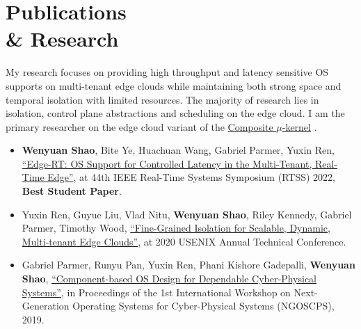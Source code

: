 \section{Publications\\ \& Research}
{\hspace*{1.7em} My research focuses on providing high throughput and latency sensitive OS supports on multi-tenant edge clouds while maintaining both strong space and temporal isolation with limited resources.
The majority of research lies in isolation, control plane abstractions and scheduling on the edge cloud.
I am the primary researcher on the edge cloud variant of the \href{https://composite.seas.gwu.edu/}{Composite $\mu$-kernel} .}

\vspace{0.2em}
\begin{itemize}[leftmargin=*]
  \setlength\itemsep{-0.0em}
  \item \textbf{Wenyuan Shao}, Bite Ye, Huachuan Wang, Gabriel Parmer, Yuxin Ren, \href{https://www2.seas.gwu.edu/~gparmer/publications/rtss22edgert.pdf}{\enquote{Edge-RT: OS Support for Controlled Latency in the Multi-Tenant, Real-Time Edge}}, at 44th IEEE Real-Time Systems Symposium (RTSS) 2022, \textbf{Best Student Paper}.
  \item Yuxin Ren, Guyue Liu, Vlad Nitu, \textbf{Wenyuan Shao}, Riley Kennedy, Gabriel Parmer, Timothy Wood, \href{https://www.usenix.org/system/files/atc20-ren.pdf}{\enquote{Fine-Grained Isolation for Scalable, Dynamic, Multi-tenant Edge Clouds}}, at 2020 USENIX Annual Technical Conference.
  \item Gabriel Parmer, Runyu Pan, Yuxin Ren, Phani Kishore Gadepalli, \textbf{Wenyuan Shao}, \href{https://www2.seas.gwu.edu/~gparmer/publications/ngoscps_19.pdf}{\enquote{Component-based OS Design for Dependable Cyber-Physical Systems}}, in Proceedings of the 1st International Workshop on Next-Generation Operating Systems for Cyber-Physical Systems (NGOSCPS), 2019.
\end{itemize} 

